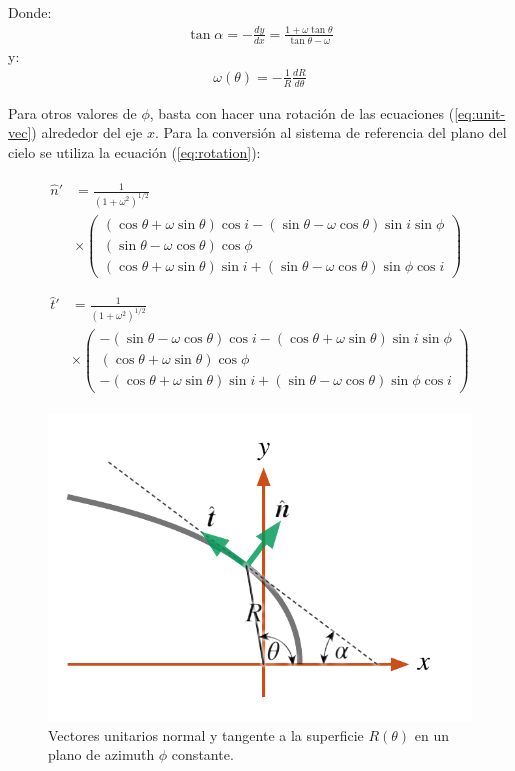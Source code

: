 Donde:
\begin{align}
  \tan\alpha = -\frac{dy}{dx} = \frac{1+\omega\tan\theta}{\tan\theta-\omega}
\end{align}
y:
\begin{align}
  \omega(\theta) = -\frac{1}{R}\frac{dR}{d\theta} 
\end{align}

Para otros valores de $\phi$, basta con hacer una rotación de las ecuaciones
(\ref{eq:unit-vec}) alrededor del eje $x$. Para la conversión al sistema de
referencia del plano del cielo se utiliza la ecuación (\ref{eq:rotation}):

\begin{align}
\begin{split}
  \hat{n}' &= \frac{1}{\left(1 + \omega^2\right)^{1/2}} \\
           & \times \left(
             \begin{array}{c}
               (\cos\theta+\omega\sin\theta)\cos i-(\sin\theta-\omega\cos\theta)\sin i\sin\phi\\
               (\sin\theta-\omega\cos\theta)\cos\phi \\
               (\cos\theta+\omega\sin\theta)\sin i+(\sin\theta-\omega\cos\theta)\sin\phi\cos i
             \end{array}
                    \right) \\
\end{split}\\
\begin{split}
    \hat{t}' &= \frac{1}{\left(1 + \omega^2\right)^{1/2}} \\
           & \times \left(
             \begin{array}{c}
               -(\sin\theta-\omega\cos\theta)\cos i-(\cos\theta+\omega\sin\theta)\sin i\sin\phi\\
               (\cos\theta+\omega\sin\theta)\cos\phi \\
               -(\cos\theta+\omega\sin\theta)\sin i+(\sin\theta-\omega\cos\theta)\sin\phi\cos i
             \end{array}
             \right)
\end{split} 
\end{align}


\begin{figure}
  \includegraphics[width=0.6\linewidth]{./Figures/bowshock-unit-vectors}
  \caption{Vectores unitarios normal y tangente a la superficie $R(\theta)$
    en un plano de azimuth $\phi$ constante.}
    \label{fig:unit-vec}
\end{figure}


